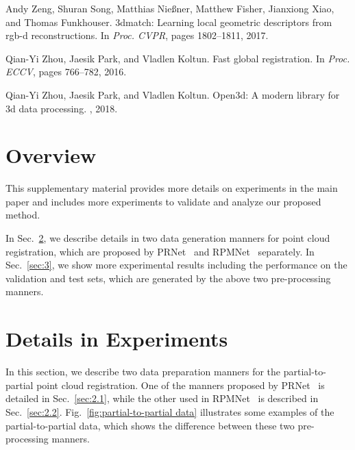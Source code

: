 \documentclass[10pt,twocolumn,letterpaper]{article}
\begin{document}
\begin{thebibliography}{10}
Andy Zeng, Shuran Song, Matthias Nie{\ss}ner, Matthew Fisher, Jianxiong Xiao,
  and Thomas Funkhouser.
\newblock 3dmatch: Learning local geometric descriptors from rgb-d
  reconstructions.
\newblock In {\em {Proc. CVPR}}, pages 1802--1811, 2017.

Qian-Yi Zhou, Jaesik Park, and Vladlen Koltun.
\newblock Fast global registration.
\newblock In {\em {Proc. ECCV}}, pages 766--782, 2016.

Qian-Yi Zhou, Jaesik Park, and Vladlen Koltun.
\newblock Open3d: {A} modern library for 3d data processing.
, 2018.

\end{thebibliography}


\clearpage
\appendix

\section{Overview}
This supplementary material provides more details on experiments in the main paper and includes more experiments to validate and analyze our proposed method.

In Sec.~\ref{sec:2}, we describe details in two data generation manners for point cloud registration, which are proposed by PRNet~\cite{wang2019prnet} and RPMNet~\cite{yew2020-RPMNet} separately. In Sec.~\ref{sec:3}, we show more experimental results including the performance on the validation and test sets, which are generated by the above two pre-processing manners. 
\section{Details in Experiments}
\label{sec:2}
In this section, we describe two data preparation manners for the partial-to-partial point cloud registration. One of the  manners proposed by PRNet~\cite{wang2019prnet} is detailed in Sec.~\ref{sec:2.1}, while the other  used in RPMNet~\cite{yew2020-RPMNet} is described in Sec.~\ref{sec:2.2}. Fig.~\ref{fig:partial-to-partial data} illustrates some examples of the partial-to-partial data, which shows the difference between these two pre-processing manners.
\end{document}
